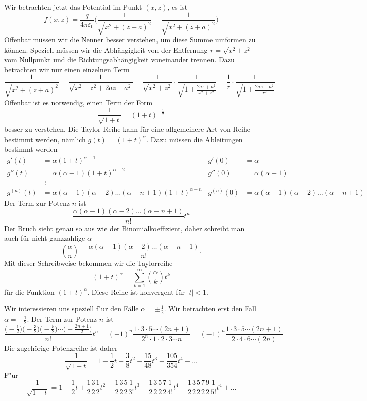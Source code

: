 Wir betrachten jetzt das Potential im Punkt $(x,z)$, es ist
\[
f(x,z)
=
\frac{q}{4\pi\varepsilon_0}
\biggl(
\frac{1}{\sqrt{x^2 + (z-a)^2}}
-
\frac{1}{\sqrt{x^2 + (z+a)^2}}
\biggr)
\]
Offenbar müssen wir die Nenner besser verstehen, um diese Summe 
umformen zu können.
Speziell müssen wir die Abhängigkeit von der Entfernung
$r=\sqrt{x^2+z^2}$ vom Nullpunkt
und die Richtungsabhängigkeit voneinander trennen.
Dazu betrachten wir nur einen einzelnen Term
\[
\frac{1}{\sqrt{x^2+(z+a)^2}}
=
\frac{1}{\sqrt{x^2+z^2+2az+a^2}}
=
\frac{1}{\sqrt{x^2+z^2}} \cdot \frac{1}{\sqrt{1+\frac{2az+a^2}{x^2+z^2}}}
=
\frac{1}{r} \cdot \frac{1}{\sqrt{1+\frac{2az+a^2}{r^2}}}
\]
Offenbar ist es notwendig, einen Term der Form
\[
\frac{1}{\sqrt{1+t}}
=
(1+t)^{-\frac12}
\]
besser zu verstehen.
Die Taylor-Reihe kann für eine allgemeinere Art von Reihe bestimmt werden,
nämlich $g(t)=(1+t)^\alpha$.
Dazu müssen die Ableitungen bestimmt werden
\begin{align*}
g'(t)
&=
\alpha(1+t)^{\alpha-1}
&
g'(0)&=\alpha
\\
g''(t)
&=
\alpha(\alpha-1)(1+t)^{\alpha-2}
&
g''(0)&=\alpha(\alpha-1)
\\
&\;\vdots
\\
g^{(n)}(t)
&=
\alpha(\alpha-1)(\alpha-2)\dots(\alpha-n+1) (1+t)^{\alpha -n}
&
g^{(n)}(0)&=\alpha(\alpha-1)(\alpha-2)\dots(\alpha -n +1)
\end{align*}
Der Term zur Potenz $n$ ist
\[
\frac{\alpha(\alpha-1)(\alpha-2)\dots(\alpha-n+1)}{n!} t^n
\]
Der Bruch sieht genau so aus wie der Binomialkoeffizient, daher schreibt
man auch für nicht ganzzahlige $\alpha$
\[
\binom{\alpha}{n}
=
\frac{\alpha(\alpha-1)(\alpha-2)\dots(\alpha-n+1)}{n!}.
\]
Mit dieser Schreibweise bekommen wir die Taylorreihe
\[
(1+t)^\alpha=\sum_{k=1}^\infty \binom{\alpha}{k} t^k
\]
für die Funktion $(1+t)^\alpha$.
Diese Reihe ist konvergent für $|t|<1$.

Wir interessieren uns speziell f"ur den Fälle $\alpha=\pm\frac12$.
Wir betrachten erst den Fall $\alpha=-\frac12$.
Der Term zur Potenz $n$ ist
\[
\frac{
\bigl(-\frac12\bigr)
\bigl(-\frac32\bigr)
\bigl(-\frac52\bigr)
\cdots
\bigl(-\frac{2n+1}2\bigr)}{n!} t^n
=
(-1)^n \frac{1\cdot 3\cdot 5 \cdots (2n + 1)}{2^n\cdot 1\cdot 2\cdot 3\cdots n}
=
(-1)^n \frac{1\cdot 3\cdot 5 \cdots (2n+1)}{2\cdot 4\cdot 6\cdots (2n)}
\]
Die zugehörige Potenzreihe ist daher
\[
\frac1{\sqrt{1+t}}
=
1-\frac12t+\frac3{8}t^2-\frac{15}{48}t^3+\frac{105}{354}t^4-\dots
\]
F"ur 
\[
\frac1{\sqrt{1+t}}
=
1-\frac12 t
+ \frac12\frac32\frac12 t^2
- \frac 12\frac32\frac 52\frac1{3!} t^3
+ \frac 12\frac32\frac 52\frac72\frac1{4!} t^4
- \frac 12\frac32\frac 52\frac72\frac92\frac1{5!} t^4
+\dots
\]


